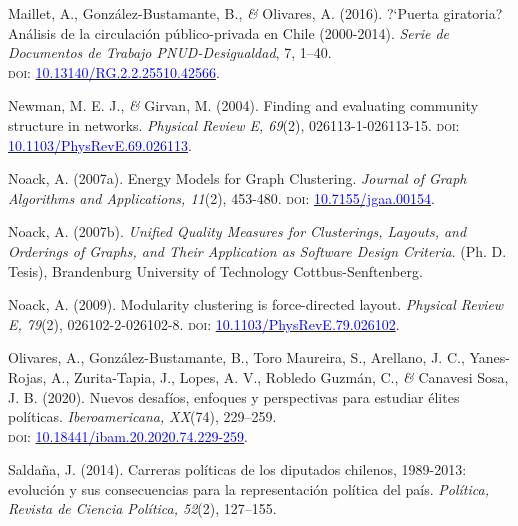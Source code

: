\documentclass[a4paper]{tufte-handout}
\begin{document}
{\begin{list}{}
\item{\small Maillet, A., Gonz\'alez-Bustamante, B., {\itshape \&} Olivares, A. (2016). ?`Puerta giratoria? An\'alisis de la circulaci\'on p\'ublico-privada en Chile (2000-2014). {\itshape Serie de Documentos de Trabajo PNUD-Desigualdad}, 7,  1--40. \\ {\scshape doi:} \href{https://doi.org/10.13140/RG.2.2.25510.42566}{\textcolor{blue}{10.13140/RG.2.2.25510.42566}}.}

\item {\small Newman, M. E. J., {\itshape \&} Girvan, M. (2004). Finding and evaluating community structure in networks. {\itshape Physical Review E, 69}(2), 026113-1-026113-15. {\scshape doi:} \href{https://doi.org/10.1103/PhysRevE.69.026113}{\textcolor{blue}{10.1103/PhysRevE.69.026113}}.}

\item{\small Noack, A. (2007a). Energy Models for Graph Clustering. {\itshape Journal of Graph Algorithms and Applications, 11}(2), 453-480. {\scshape doi:} \href{http://dx.doi.org/10.7155/jgaa.00154}{\textcolor{blue}{10.7155/jgaa.00154}}.}

\item{\small Noack, A. (2007b). {\itshape Unified Quality Measures for Clusterings, Layouts, and Orderings of Graphs, and Their Application as Software Design Criteria}. (Ph. D. Tesis), Brandenburg University of Technology Cottbus-Senftenberg.}

\item{\small Noack, A. (2009). Modularity clustering is force-directed layout. {\itshape Physical Review E, 79}(2), 026102-2-026102-8. {\scshape doi:} \href{https://doi.org/10.1103/PhysRevE.79.026102}{\textcolor{blue}{10.1103/PhysRevE.79.026102}}.}

\item{\small Olivares, A., González-Bustamante, B., Toro Maureira, S., Arellano, J. C., Yanes-Rojas, A., Zurita-Tapia, J., Lopes, A. V., Robledo Guzmán, C., {\itshape \&} Canavesi Sosa, J. B. (2020). Nuevos desafíos, enfoques y perspectivas para estudiar élites políticas. {\itshape Iberoamericana, XX}(74), 229--259. \\ {\scshape doi:} \href{http://doi.org/10.18441/ibam.20.2020.74.229-259}{\textcolor{blue}{10.18441/ibam.20.2020.74.229-259}}.}

\item{\small Saldaña, J. (2014). Carreras políticas de los diputados chilenos, 1989-2013: evolución y sus consecuencias para la representación política del país. {\itshape Política, Revista de Ciencia Política, 52}(2), 127--155.}


\end{list}}
\end{document}
